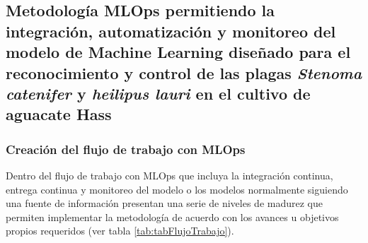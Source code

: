 
\subsection{Metodología MLOps permitiendo la integración, automatización y monitoreo del modelo de Machine Learning diseñado para el reconocimiento y control de las plagas \textit{Stenoma catenifer} y \textit{heilipus lauri} en el cultivo de aguacate Hass}

\subsubsection{Creación del flujo de trabajo con MLOps}

Dentro del flujo de trabajo con MLOps que incluya la integración continua, entrega continua y monitoreo del modelo o los modelos normalmente siguiendo una fuente de información presentan una serie de niveles de madurez que permiten implementar la metodología de acuerdo con los avances u objetivos propios requeridos (ver tabla \ref{tab:tabFlujoTrabajo}).

